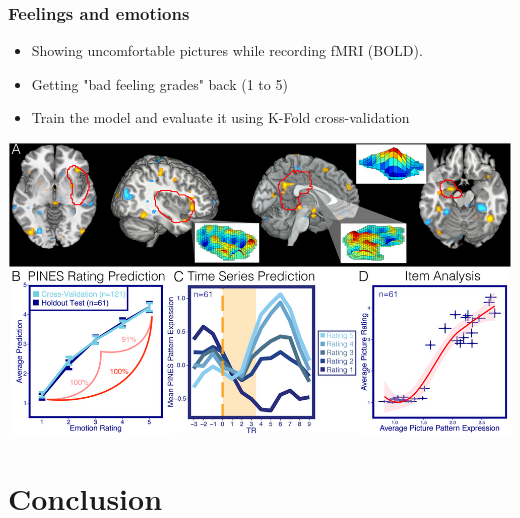 \documentclass{beamer}
\begin{document}
\note{

}

\begin{frame}
\frametitle{Feelings and emotions}
\begin{minipage}{.45\linewidth}
\begin{itemize}
\item Showing uncomfortable pictures while recording fMRI (BOLD).
\item Getting "bad feeling grades" back (1 to 5)
\item Train the model and evaluate it using K-Fold cross-validation
\end{itemize}
\end{minipage}
\hfill
\begin{minipage}{.45\linewidth}
\begin{center}
\includegraphics[scale=.2]{emotionpred.png}
\end{center}
\end{minipage}

\end{frame}

\note{

}


\section{Conclusion}
\end{document}
